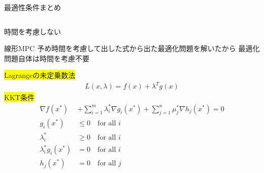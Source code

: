 \documentclass[twocolumn, dvipdfmx,12pt]{beamer}
\begin{document}
    \begin{frame}{最適性条件まとめ}
        \fontsize{6.5pt}{6.5pt}\selectfont
        
        \begin{columns}
            \begin{column}{.6\textwidth}
                \begin{itembox}[l]{時間を考慮しない}
                    \begin{itembox}[l]{線形MPC}
                        予め時間を考慮して出した式から出た最適化問題を解いたから
                        最適化問題自体は時間を考慮不要\\
                    \end{itembox}
                    \colorbox{yellow}{Lagrangeの未定乗数法}\\
                    \begin{align*}
                        L(x, \lambda) = f(x) + \lambda^T g(x)
                    \end{align*}
                    \colorbox{yellow}{KKT条件}\\
                    \begin{align*}
                        \nabla f(x^*) &+ \sum_{i=1}^m \lambda_i^* \nabla g_i(x^*) + \sum_{j=1}^n \mu_j^* \nabla h_j(x^*) = 0 \\
                        g_i(x^*) &\leq 0 \quad \text{for all } i \\
                        \lambda_i^* &\geq 0 \quad \text{for all } i \\
                        \lambda_i^* g_i(x^*) &= 0 \quad \text{for all } i \\
                        h_j(x^*) &= 0 \quad \text{for all } j
                    \end{align*}
                \end{itembox}
            \end{column}


\end{columns}
\end{frame}
\end{document}
